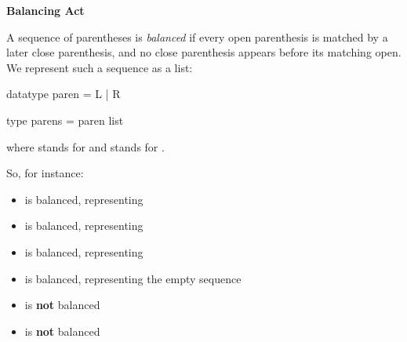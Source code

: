 
\textbf{Balancing Act}

A sequence of parentheses is \textit{balanced} if every open parenthesis is
matched by a later close parenthesis, and no close parenthesis appears before
its matching open. We represent such a sequence as a list:

\begin{codeblock}
  datatype paren = L | R

  type parens = paren list
\end{codeblock}

where  stands for \code{(} and  stands for \code{)}.

So, for instance:
\begin{itemize}
  \item \code{[L, R]} is balanced, representing \code{()}
  \item \code{[L, L, R, R]} is balanced, representing \code{(())}
  \item \code{[L, R, L, R]} is balanced, representing \code{()()}
  \item \code{[]} is balanced, representing the empty sequence
  \item \code{[R, L]} is \textbf{not} balanced
  \item \code{[L, L, R]} is \textbf{not} balanced
\end{itemize}

